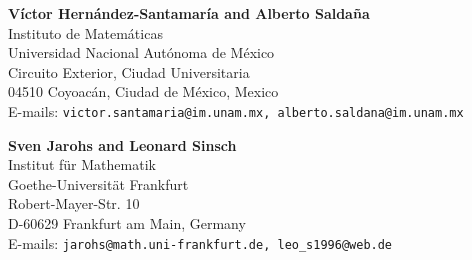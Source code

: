 \documentclass[11 pt]{article}
\numberwithin{equation}{section}
\begin{document}
%
%
%
%

 
 

\bigskip
\begin{flushleft}
\textbf{Víctor Hernández-Santamaría and Alberto Saldaña}\\
Instituto de Matemáticas\\
Universidad Nacional Autónoma de México\\
Circuito Exterior, Ciudad Universitaria\\
04510 Coyoacán, Ciudad de México, Mexico\\
E-mails: \texttt{victor.santamaria@im.unam.mx, alberto.saldana@im.unam.mx} 
\vspace{.3cm}
\end{flushleft}
\begin{flushleft}
\textbf{Sven Jarohs and Leonard Sinsch}\\
Institut f\"ur Mathematik\\
Goethe-Universit\"at Frankfurt\\
Robert-Mayer-Str. 10\\
D-60629 Frankfurt am Main, Germany  \\
E-mails: \texttt{jarohs@math.uni-frankfurt.de, leo\_s1996@web.de} 
\vspace{.3cm}
\end{flushleft}
\end{document}
